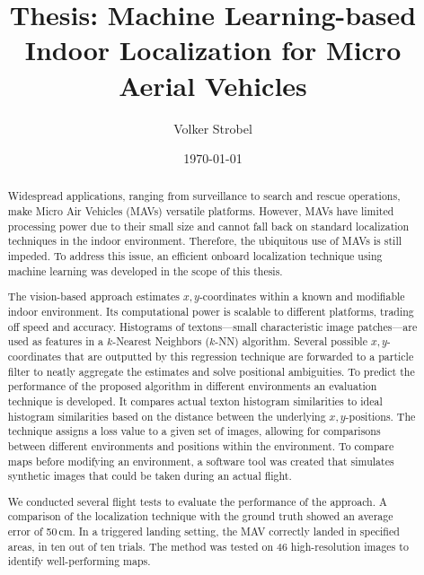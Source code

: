 \documentclass{report}
\title{Thesis: Machine Learning-based Indoor Localization for Micro
  Aerial Vehicles}
\author{Volker Strobel}
\date{\today}
\begin{document}
\maketitle
\begin{abstract}
  Widespread applications, ranging from surveillance to search and
  rescue operations, make Micro Air Vehicles (MAVs) versatile
  platforms. However, MAVs have limited processing power due to their
  small size and cannot fall back on standard localization techniques
  in the indoor environment. Therefore, the ubiquitous use of MAVs is
  still impeded. To address this issue, an efficient onboard
  localization technique using machine learning was developed in the
  scope of this thesis.

  The vision-based approach estimates $x,y$-coordinates within a known
  and modifiable indoor environment. Its computational power is
  scalable to different platforms, trading off speed and
  accuracy. Histograms of textons---small characteristic image
  patches---are used as features in a $k$-Nearest Neighbors ($k$-NN)
  algorithm. Several possible $x,y$-coordinates that are outputted by
  this regression technique are forwarded to a particle filter to
  neatly aggregate the estimates and solve positional ambiguities.
  To predict the performance of the proposed algorithm in different
  environments an evaluation technique is developed. It compares
  actual texton histogram similarities to ideal histogram similarities
  based on the distance between the underlying $x,y$-positions. The
  technique assigns a loss value to a given set of images, allowing
  for comparisons between different environments and positions within
  the environment. To compare maps before modifying an environment, a
  software tool was created that simulates synthetic images that could
  be taken during an actual flight.


  We conducted several flight tests to evaluate the performance of the
  approach. A comparison of the localization technique with the ground
  truth showed an average error of 50\,cm. In a triggered landing
  setting, the MAV correctly landed in specified areas, in ten out of
  ten trials. The method was tested on 46 high-resolution images to
  identify well-performing maps.


\end{abstract}
\end{document}
